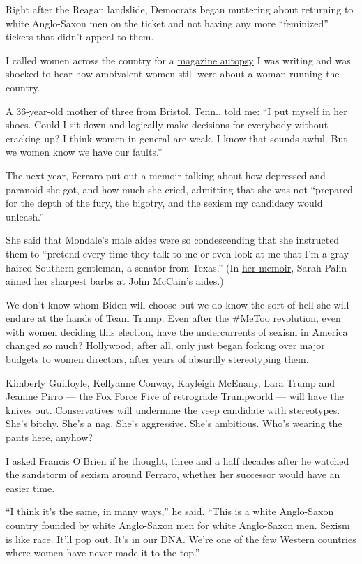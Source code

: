 Right after the Reagan landslide, Democrats began muttering about
returning to white Anglo-Saxon men on the ticket and not having any more
``feminized'' tickets that didn't appeal to them.

I called women across the country for a
\href{https://www.nytimes.com/1984/12/30/magazine/reassessing-women-s-political-role-the-lasting-impact-of-geraldine-ferraro.html}{magazine
autopsy} I was writing and was shocked to hear how ambivalent women
still were about a woman running the country.

A 36-year-old mother of three from Bristol, Tenn., told me: ``I put
myself in her shoes. Could I sit down and logically make decisions for
everybody without cracking up? I think women in general are weak. I know
that sounds awful. But we women know we have our faults.''

The next year, Ferraro put out a memoir talking about how depressed and
paranoid she got, and how much she cried, admitting that she was not
``prepared for the depth of the fury, the bigotry, and the sexism my
candidacy would unleash.''

She said that Mondale's male aides were so condescending that she
instructed them to ``pretend every time they talk to me or even look at
me that I'm a gray-haired Southern gentleman, a senator from Texas.''
(In \href{https://www.nytimes.com/2009/11/15/books/15book.html}{her
memoir}, Sarah Palin aimed her sharpest barbs at John McCain's aides.)

We don't know whom Biden will choose but we do know the sort of hell she
will endure at the hands of Team Trump. Even after the \#MeToo
revolution, even with women deciding this election, have the
undercurrents of sexism in America changed so much? Hollywood, after
all, only just began forking over major budgets to women directors,
after years of absurdly stereotyping them.

Kimberly Guilfoyle, Kellyanne Conway, Kayleigh McEnany, Lara Trump and
Jeanine Pirro --- the Fox Force Five of retrograde Trumpworld --- will
have the knives out. Conservatives will undermine the veep candidate
with stereotypes. She's bitchy. She's a nag. She's aggressive. She's
ambitious. Who's wearing the pants here, anyhow?

I asked Francis O'Brien if he thought, three and a half decades after he
watched the sandstorm of sexism around Ferraro, whether her successor
would have an easier time.

``I think it's the same, in many ways,'' he said. ``This is a white
Anglo-Saxon country founded by white Anglo-Saxon men for white
Anglo-Saxon men. Sexism is like race. It'll pop out. It's in our DNA.
We're one of the few Western countries where women have never made it to
the top.''

